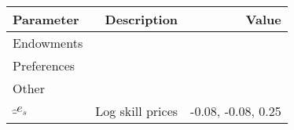 \begin{tabular}{lrr}
\hline
Parameter & Description  & Value  \\
\hline
Endowments &   &   \\
Preferences &   &   \\
Other &   &   \\
$\hat_{e}_{s}$ & Log skill prices  & -0.08, -0.08, 0.25  \\
\hline
\end{tabular}%

